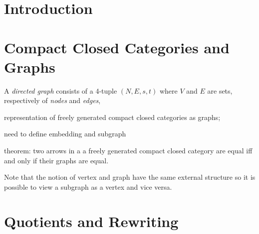 \documentclass[runningheads]{llncs}
\begin{document}
\section{Introduction}
\label{sec:introduction}

\section{Compact Closed Categories and Graphs}
\label{sec:mono-categ-graphs}

\begin{definition}
  A \emph{directed graph} consists of a 4-tuple $(N,E,s,t)$ where $V$
  and $E$ are sets, respectively of \emph{nodes} and \emph{edges}, 
\end{definition}

representation of freely generated compact closed  categories  as
graphs;

need to define embedding and subgraph

theorem: two arrows in a a freely generated compact closed  category
are equal iff and only if their graphs are equal.

Note that the notion of vertex and graph have the same external
structure so it is possible to view a subgraph as a vertex and vice versa.

\section{Quotients and Rewriting}
\label{sec:quotients-rewriting}
\end{document}
